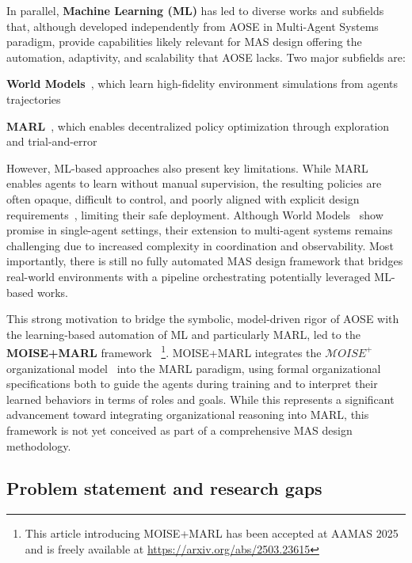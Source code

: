\documentclass[pdflatex,sn-mathphys-num]{sn-jnl}%
\theoremstyle{thmstyleone}%
\theoremstyle{thmstyletwo}%
\theoremstyle{thmstylethree}%
\begin{document}
In parallel, \textbf{Machine Learning (ML)} has led to diverse works and subfields that, although developed independently from AOSE in Multi-Agent Systems paradigm, provide capabilities likely relevant for MAS design offering the automation, adaptivity, and scalability that AOSE lacks. Two major subfields are:
\begin{enumerate*}[label={\roman*)}, itemjoin={; \quad}]
    \item \textbf{World Models}~\cite{Ha2018}, which learn high-fidelity environment simulations from agents trajectories
    \item \textbf{MARL}~\cite{Zhang2021, Papoudakis2021}, which enables decentralized policy optimization through exploration and trial-and-error
\end{enumerate*}

However, ML-based approaches also present key limitations. While MARL enables agents to learn without manual supervision, the resulting policies are often opaque, difficult to control, and poorly aligned with explicit design requirements~\cite{Nguyen2020, Du2022}, limiting their safe deployment.
Although World Models~\cite{Ha2018} show promise in single-agent settings, their extension to multi-agent systems remains challenging due to increased complexity in coordination and observability.
Most importantly, there is still no fully automated MAS design framework that bridges real-world environments with a pipeline orchestrating potentially leveraged ML-based works.

This strong motivation to bridge the symbolic, model-driven rigor of AOSE with the learning-based automation of ML and particularly MARL, led to the \textbf{MOISE+MARL} framework~\cite{soule2025moisemarl}%
\footnote{This article introducing MOISE+MARL has been accepted at AAMAS 2025 and is freely available at \url{https://arxiv.org/abs/2503.23615}}.
%
MOISE+MARL integrates the $\mathcal{M}OISE^+$ organizational model~\cite{Hubner2002} into the MARL paradigm, using formal organizational specifications both to guide the agents during training and to interpret their learned behaviors in terms of roles and goals. While this represents a significant advancement toward integrating organizational reasoning into MARL, this framework is not yet conceived as part of a comprehensive MAS design methodology.

\subsection{Problem statement and research gaps}
\end{document}

